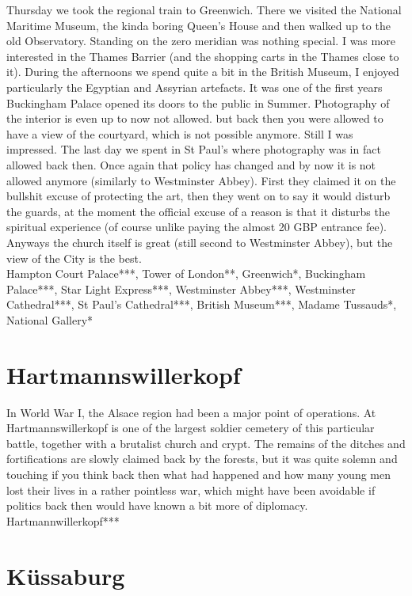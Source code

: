 Thursday we took the regional train to Greenwich. There we visited the National Maritime Museum, the kinda boring Queen's House and then walked up to the old Observatory. Standing on the zero meridian was nothing special. I was more interested in the Thames Barrier (and the shopping carts in the Thames close to it). During the afternoons we spend quite a bit in the British Museum, I enjoyed particularly the Egyptian and Assyrian artefacts. It was one of the first years Buckingham Palace opened its doors to the public in Summer. Photography of the interior is even up to now not allowed. but back then you were allowed to have a view of the courtyard, which is not possible anymore. Still I was impressed. The last day we spent in St Paul's where photography was in fact allowed back then. Once again that policy has changed and by now it is not allowed anymore (similarly to Westminster Abbey). First they claimed it on the bullshit excuse of protecting the art, then they went on to say it would disturb the guards, at the moment the official excuse of a reason is that it disturbs the spiritual experience (of course unlike paying the almost 20 GBP entrance fee). Anyways the church itself is great (still second to Westminster Abbey), but the view of the City is the best.\\

Hampton Court Palace***, Tower of London**, Greenwich*, Buckingham Palace***, Star Light Express***, Westminster Abbey***, Westminster Cathedral***, St Paul's Cathedral***, British Museum***, Madame Tussauds*, National Gallery*

\section{Hartmannswillerkopf}
\label{1996:Hartmannswillerkopf}

In World War I, the Alsace region had been a major point of operations. At Hartmannswillerkopf is one of the largest soldier cemetery of this particular battle, together with a brutalist church and crypt. The remains of the ditches and fortifications are slowly claimed back by the forests, but it was quite solemn and touching if you think back then what had happened and how many young men lost their lives in a rather pointless war, which might have been avoidable if politics back then would have known a bit more of diplomacy.\\

Hartmannwillerkopf***

\section{K\"ussaburg}
\label{1996:Kuessaburg}

